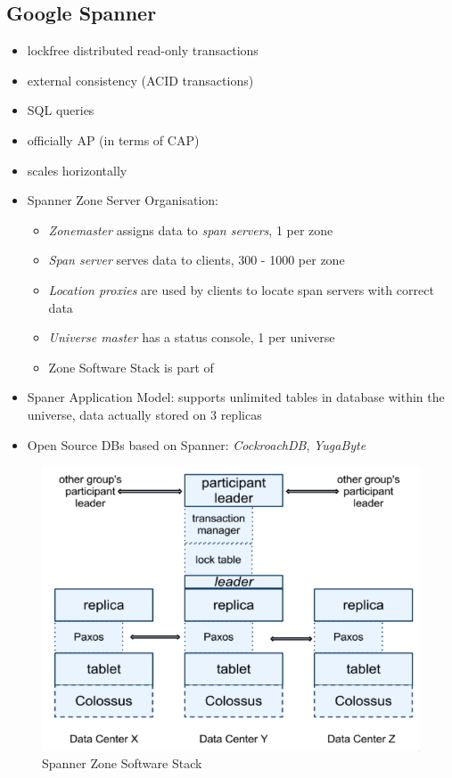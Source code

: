 \documentclass[a4paper]{article}
\begin{document}
\begin{multicols}{3}
\subsection{Google Spanner}
\begin{itemize}
    \item lockfree distributed read-only transactions
    \item external consistency (ACID transactions)
    \item SQL queries
    \item officially AP (in terms of CAP)
    \item scales horizontally
    \item Spanner Zone Server Organisation:
        \begin{itemize}
            \item \textit{Zonemaster} assigns data to \textit{span servers}, 1 per zone
            \item \textit{Span server} serves data to clients, 300 - 1000 per zone
            \item \textit{Location proxies} are used by clients to locate span servers with correct data
            \item \textit{Universe master} has a status console, 1 per universe
            \item Zone Software Stack is part of 
        \end{itemize}
    \item Spaner Application Model: supports unlimited tables in database within the universe, data actually stored on 3 replicas
    \item Open Source DBs based on Spanner: \textit{CockroachDB}, \textit{YugaByte}
\end{itemize}

\begin{figure}[H]
    \includegraphics[width=\linewidth]{ZoneSoftwareStack.png}
    \caption{Spanner Zone Software Stack}
    \label{fig:zonesoftwarestack}
\end{figure}


\end{multicols}
\end{document}
